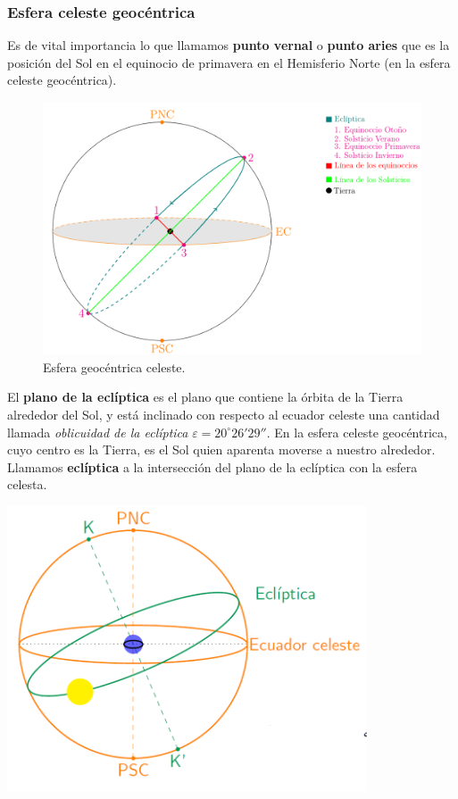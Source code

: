 \subsubsection{Esfera celeste geocéntrica}

Es de vital importancia lo que llamamos \textbf{punto vernal} o \textbf{punto aries} que es la posición del Sol en el equinocio de primavera en el Hemisferio Norte (en la esfera celeste geocéntrica).

\begin{figure}[h!] \centering
	\includegraphics[width=0.6\linewidth]{Cuerpo/Ch_01/Geocentricas.png}
	\caption{Esfera geocéntrica celeste.}
	\label{Fig:01-orto}
\end{figure}


\begin{minipage}{0.6\textwidth}
	El \textbf{plano de la eclíptica} es el plano que contiene la órbita de la Tierra alrededor del Sol, y está inclinado con respecto al ecuador celeste una cantidad llamada \textit{oblicuidad de la eclíptica} $\varepsilon=20^\circ 26'29''$. En la esfera celeste geocéntrica, cuyo centro es la Tierra, es el Sol quien aparenta moverse a nuestro alrededor. Llamamos \textbf{eclíptica} a la intersección del plano de la eclíptica con la esfera celesta. %
\end{minipage}	\hfill
\begin{minipage}{0.38\textwidth} \centering
	\includegraphics[width=0.8\textwidth]{Cuerpo/Imagenes/01_Ecliptica.png}
\end{minipage}




